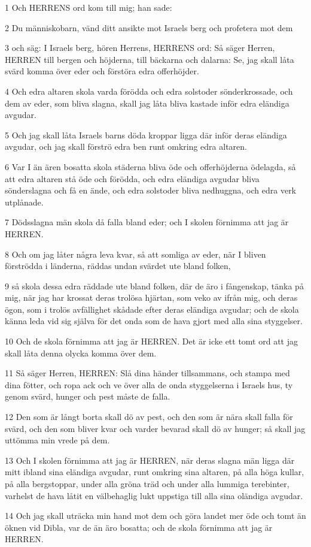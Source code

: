\par 1 Och HERRENS ord kom till mig; han sade:
\par 2 Du människobarn, vänd ditt ansikte mot Israels berg och profetera mot dem
\par 3 och säg: I Israels berg, hören Herrens, HERRENS ord: Så säger Herren, HERREN till bergen och höjderna, till bäckarna och dalarna: Se, jag skall låta svärd komma över eder och förstöra edra offerhöjder.
\par 4 Och edra altaren skola varda förödda och edra solstoder sönderkrossade, och dem av eder, som bliva slagna, skall jag låta bliva kastade inför edra eländiga avgudar.
\par 5 Och jag skall låta Israels barns döda kroppar ligga där inför deras eländiga avgudar, och jag skall förströ edra ben runt omkring edra altaren.
\par 6 Var I än ären bosatta skola städerna bliva öde och offerhöjderna ödelagda, så att edra altaren stå öde och förödda, och edra eländiga avgudar bliva sönderslagna och få en ände, och edra solstoder bliva nedhuggna, och edra verk utplånade.
\par 7 Dödsslagna män skola då falla bland eder; och I skolen förnimma att jag är HERREN.
\par 8 Och om jag låter några leva kvar, så att somliga av eder, när I bliven förströdda i länderna, räddas undan svärdet ute bland folken,
\par 9 så skola dessa edra räddade ute bland folken, där de äro i fångenskap, tänka på mig, när jag har krossat deras trolösa hjärtan, som veko av ifrån mig, och deras ögon, som i trolös avfällighet skådade efter deras eländiga avgudar; och de skola känna leda vid sig själva för det onda som de hava gjort med alla sina styggelser.
\par 10 Och de skola förnimma att jag är HERREN. Det är icke ett tomt ord att jag skall låta denna olycka komma över dem.
\par 11 Så säger Herren, HERREN: Slå dina händer tillsammans, och stampa med dina fötter, och ropa ack och ve över alla de onda styggelserna i Israels hus, ty genom svärd, hunger och pest måste de falla.
\par 12 Den som är långt borta skall dö av pest, och den som är nära skall falla för svärd, och den som bliver kvar och varder bevarad skall dö av hunger; så skall jag uttömma min vrede på dem.
\par 13 Och I skolen förnimma att jag är HERREN, när deras slagna män ligga där mitt ibland sina eländiga avgudar, runt omkring sina altaren, på alla höga kullar, på alla bergstoppar, under alla gröna träd och under alla lummiga terebinter, varhelst de hava låtit en välbehaglig lukt uppstiga till alla sina oländiga avgudar.
\par 14 Och jag skall uträcka min hand mot dem och göra landet mer öde och tomt än öknen vid Dibla, var de än äro bosatta; och de skola förnimma att jag är HERREN.

